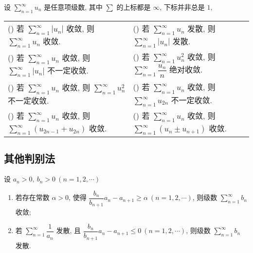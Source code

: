 \begin{theorem}
    设 $\displaystyle\sum_{n=1}^{\infty}u_n$ 是任意项级数, 其中 $\sum$ 的上标都是 $\infty$, 下标并非总是 $1$,
    \setcounter{magicrownumbers}{0}
    \begin{table}[H]
        \centering
        \begin{tabular}{l l}
            (\rownumber{}) 若 $\displaystyle \sum_{n=1}^{\infty}|u_n|$ 收敛, 则 $\displaystyle\sum_{n=1}^{\infty}u_n$ 收敛.            & (\rownumber{}) 若 $\displaystyle\sum_{n=1}^{\infty}u_n$ 发散, 则 $\displaystyle\sum_{n=1}^{\infty}|u_n|$ 发散.                \\
            (\rownumber{}) 若 $\displaystyle\sum_{n=1}^{\infty}u_n$ 收敛, 则 $\displaystyle\sum_{n=1}^{\infty}|u_n|$ 不一定收敛.       & (\rownumber{}) 若 $\displaystyle\sum_{n=1}^{\infty}u^2_n$ 收敛, 则 $\displaystyle\sum_{n=1}^{\infty}\dfrac{u_n}{n}$ 绝对收敛. \\
            (\rownumber{}) 若 $\displaystyle\sum_{n=1}^{\infty}u_n$ 收敛, 则 $\displaystyle\sum_{n=1}^{\infty}u^2_n$ 不一定收敛.       & (\rownumber{}) 若 $\displaystyle\sum_{n=1}^{\infty}u_n$ 收敛, 则 $\displaystyle\sum_{n=1}^{\infty}u_{2n}$ 不一定收敛.         \\
            (\rownumber{}) 若 $\displaystyle\sum_{n=1}^{\infty}u_n$ 收敛, 则 $\displaystyle\sum_{n=1}^{\infty}(u_{2n-1}+u_{2n})$ 收敛. & (\rownumber{}) 若 $\displaystyle\sum_{n=1}^{\infty}u_n$ 收敛, 则 $\displaystyle\sum_{n=1}^{\infty}(u_{n}\pm u_{n+1})$ 收敛.
        \end{tabular}
    \end{table}
\end{theorem}

\subsection{其他判别法}

\begin{theorem}
    设 $a_n>0,~b_n>0~(n=1,2, \cdots )$\begin{enumerate}[label=(\arabic{*})]
        \item 若存在常数 $\alpha>0$, 使得 $\dfrac{b_n}{b_{n+1}}a_n-a_{n+1}\geqslant \alpha~(n=1,2, \cdots )$, 则级数 $\displaystyle \sum_{n=1}^{\infty}b_n$ 收敛;
        \item 若 $\displaystyle \sum_{n=1}^{\infty}\dfrac{1}{a_n}$ 发散, 且 $\dfrac{b_n}{b_{n+1}}a_n-a_{n+1}\leqslant 0~(n=1,2, \cdots )$, 则级数 $\displaystyle \sum_{n=1}^{\infty}b_n$ 发散.
    \end{enumerate}
\end{theorem}

